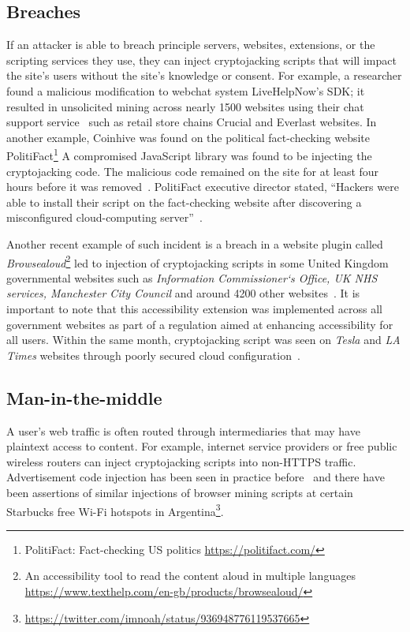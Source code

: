\subsection{Breaches} 

If an attacker is able to breach principle servers, websites, extensions, or the scripting services they use, they can inject cryptojacking scripts that will impact the site's users without the site's knowledge or consent. For example, a researcher found a malicious modification to webchat system LiveHelpNow's SDK; it resulted in unsolicited mining across nearly 1500 websites using their chat support service~\cite{chatsupporthack} such as retail store chains Crucial and Everlast websites. In another example, Coinhive was found on the political fact-checking website PolitiFact\footnote{PolitiFact: Fact-checking US politics \url{https://politifact.com/}} A compromised JavaScript library was found to be injecting the cryptojacking code. The malicious code remained on the site for at least four hours before it was removed~\cite{politifactcoinhive}. PolitiFact executive director stated, ``Hackers were able to install their script on the fact-checking website after discovering a misconfigured cloud-computing server''~\cite{politifactcoinhivewsj}. 

Another recent example of such incident is a breach in a website plugin called \textit{Browsealoud}\footnote{An accessibility tool to read the content aloud in multiple languages \url{https://www.texthelp.com/en-gb/products/browsealoud/}} led to injection of cryptojacking scripts in some United Kingdom governmental websites such as \textit{Information Commissioner`s Office, UK NHS services, Manchester City Council} and around 4200 other websites~\cite{theregisterukgovern}. It is important to note that this accessibility extension was implemented across all government websites as part of a regulation aimed at enhancing accessibility for all users. Within the same month, cryptojacking script was seen on \textit{Tesla} and \textit{LA Times} websites through poorly secured cloud configuration~\cite{nakedsecurityLatimes}.

\subsection{Man-in-the-middle} 

A user's web traffic is often routed through intermediaries that may have plaintext access to content. For example, internet service providers or free public wireless routers can inject cryptojacking scripts into non-HTTPS traffic. Advertisement code injection has been seen in practice before~\cite{vergeadinjection} and there have been assertions of similar injections of browser mining scripts at certain Starbucks free Wi-Fi hotspots in Argentina\footnote{\url{https://twitter.com/imnoah/status/936948776119537665}}.




